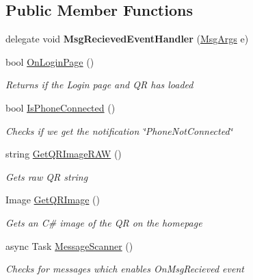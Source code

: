 \subsection*{Public Member Functions}
\begin{DoxyCompactItemize}
\item 
\mbox{\label{class_web_whatsapp_a_p_i_1_1_base_class_a33f2d663d89b991fead5ff2aba0dbc3c}} 
delegate void {\bfseries Msg\+Recieved\+Event\+Handler} (\hyperlink{class_web_whatsapp_a_p_i_1_1_base_class_1_1_msg_args}{Msg\+Args} e)
\item 
bool \hyperlink{class_web_whatsapp_a_p_i_1_1_base_class_ace95215a9d65215e30c8fe3582800878}{On\+Login\+Page} ()
\begin{DoxyCompactList}\small\item\em Returns if the Login page and QR has loaded \end{DoxyCompactList}\item 
bool \hyperlink{class_web_whatsapp_a_p_i_1_1_base_class_a8784fc769ca33afbbdb7478f0998de19}{Is\+Phone\+Connected} ()
\begin{DoxyCompactList}\small\item\em Check\textquotesingle{}s if we get the notification \char`\"{}\+Phone\+Not\+Connected\char`\"{} \end{DoxyCompactList}\item 
string \hyperlink{class_web_whatsapp_a_p_i_1_1_base_class_ad181052c89c24e15d53aa81c1afe531c}{Get\+Q\+R\+Image\+R\+AW} ()
\begin{DoxyCompactList}\small\item\em Gets raw QR string \end{DoxyCompactList}\item 
Image \hyperlink{class_web_whatsapp_a_p_i_1_1_base_class_ac9738e95307e38b1ef493c1164edb60c}{Get\+Q\+R\+Image} ()
\begin{DoxyCompactList}\small\item\em Gets an C\# image of the QR on the homepage \end{DoxyCompactList}\item 
async Task \hyperlink{class_web_whatsapp_a_p_i_1_1_base_class_a1da111623bfd6bee9401b049560e2646}{Message\+Scanner} ()
\begin{DoxyCompactList}\small\item\em Checks for messages which enables On\+Msg\+Recieved event \end{DoxyCompactList}\item 

\end{DoxyCompactItemize}

